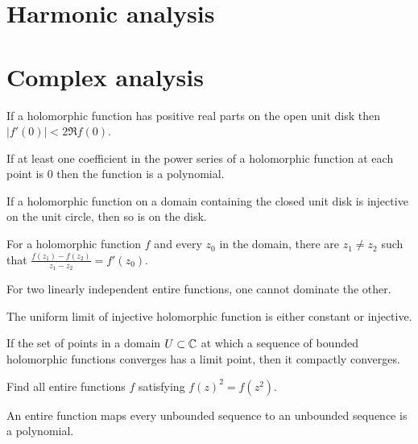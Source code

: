 \documentclass[12pt]{article}
\begin{document}
\section{Harmonic analysis}


\section{Complex analysis}

	\begin{prb}
	If a holomorphic function has positive real parts on the open unit disk then $|f'(0)|<2\Re f(0)$.
	\end{prb}

	\begin{prb}
	If at least one coefficient in the power series of a holomorphic function at each point is 0 then the function is a polynomial.
	\end{prb}

	\begin{prb}
	If a holomorphic function on a domain containing the closed unit disk is injective on the unit circle, then so is on the disk.
	\end{prb}

	\begin{prb}
	For a holomorphic function $f$ and every $z_0$ in the domain, there are $z_1\ne z_2$ such that $\frac{f(z_1)-f(z_2)}{z_1-z_2}=f'(z_0)$.
	\end{prb}

	\begin{prb}
	For two linearly independent entire functions, one cannot dominate the other.
	\end{prb}

	\begin{prb}
	The uniform limit of injective holomorphic function is either constant or injective.
	\end{prb}

	\begin{prb}
	If the set of points in a domain $U\subset\mathbb{C}$ at which a sequence of bounded holomorphic functions converges has a limit point, then it compactly converges.
	\end{prb}

	\begin{prb}
	Find all entire functions $f$ satisfying $f(z)^2=f(z^2)$.
	\end{prb}

	\begin{prb}
	An entire function maps every unbounded sequence to an unbounded sequence is a polynomial.
	\end{prb}
\end{document}
